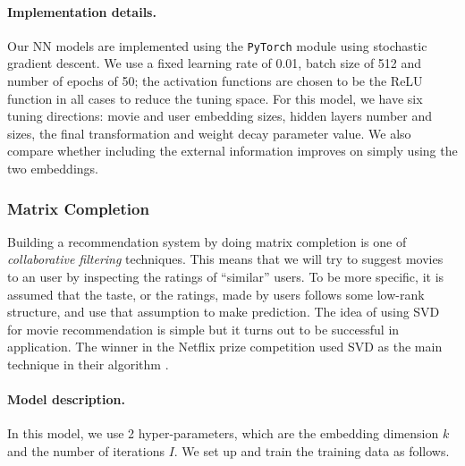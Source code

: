 \documentclass[bj, preprint]{imsart}
\begin{document}
\paragraph{Implementation details.}\label{par:method.models.nn.impl}

Our NN models are implemented using the \texttt{PyTorch} module \citep{paszke2017automatic} using stochastic gradient descent. We use a fixed learning rate of \num{0.01}, batch size of \num{512} and number of epochs of \num{50}; the activation functions are chosen to be the ReLU function in all cases to reduce the tuning space. For this model, we have six tuning directions: movie and user embedding sizes, hidden layers number and sizes, the final transformation and weight decay parameter value. We also compare whether including the external information improves on simply using the two embeddings.

\subsubsection{Matrix Completion}\label{subsubsec:method.models.svd}
Building a recommendation system by doing matrix completion is one of \textit{collaborative filtering} techniques. This means that we will try to suggest movies to an user by inspecting the ratings of ``similar'' users. To be more specific, it is assumed that the taste, or the ratings, made by users follows some low-rank structure, and use that assumption to make prediction. The idea of using SVD for movie recommendation is simple but it turns out to be successful in application. The winner in the Netflix prize competition used SVD as the main technique in their algorithm \citep{bennett2007netflix}. 

\paragraph{Model description.}\label{par:method.models.svd.model}
In this model, we use 2 hyper-parameters, which are the embedding dimension $k$ and the number of iterations $I$. We set up and train the training data as follows.
\end{document}
